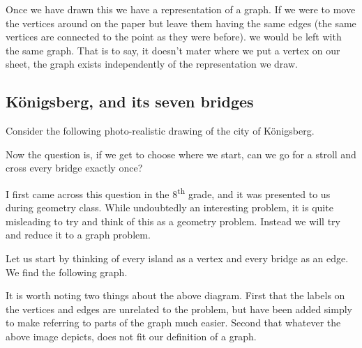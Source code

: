 \documentclass{article}
\begin{document}
Once we have drawn this we have a representation of a graph. If we were to move the vertices around on the paper but leave them having the same edges (the same vertices are connected to the point as they were before). we would be left with the same graph. That is to say, it doesn't mater where we put a vertex on our sheet, the graph exists independently of the representation we draw.

\subsection{K\"onigsberg, and its seven bridges}

Consider the following photo-realistic drawing of the city of K\"onigsberg.



Now the question is, if we get to choose where we start, can we go for a stroll and cross every bridge exactly once?

I first came across this question in the 8\textsuperscript{th} grade, and it was presented to us during geometry class. While undoubtedly an interesting problem, it is quite misleading to try and think of this as a geometry problem. Instead we will try and reduce it to a graph problem.

Let us start by thinking of every island as a vertex and every bridge as an edge. We find the following graph.

\begin{center}
\end{center}

It is worth noting two things about the above diagram. First that the labels on the vertices and edges are unrelated to the problem, but have been added simply to make referring to parts of the graph much easier. Second that whatever the above image depicts, does not fit our definition of a graph.
\end{document}

